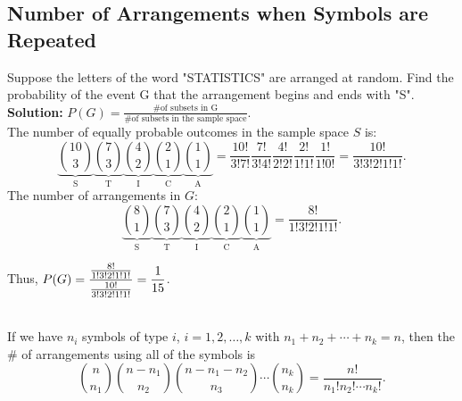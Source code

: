 \subsection{Number of Arrangements when Symbols are Repeated}

\begin{example}
    Suppose the letters of the word "STATISTICS" are arranged at random. Find the 
    probability of the event G that the arrangement begins and ends with "S". \\
    \textbf{Solution: } $P(G) = \frac{\text{\# of subsets in G}}{\text{\# of subsets in the sample space}}$. \vspace{1mm} \\
    The number of equally probable outcomes in the sample space $S$ is:
    \[
        \underbrace{\binom{10}{3}}_{\text{S}} \underbrace{\binom{7}{3}}_{\text{T}} \underbrace{\binom{4}{2}}_{\text{I}}
        \underbrace{\binom{2}{1}}_{\text{C}} \underbrace{\binom{1}{1}}_{\text{A}} =
        \frac{10!}{3!7!} \frac{7!}{3!4!} \frac{4!}{2!2!} \frac{2!}{1!1!} \frac{1!}{1!0!} = \frac{10!}{3!3!2!1!1!}.
    \]
    The number of arrangements in $G$:
    \[
        \underbrace{\binom{8}{1}}_{\text{S}} \underbrace{\binom{7}{3}}_{\text{T}} \underbrace{\binom{4}{2}}_{\text{I}}
        \underbrace{\binom{2}{1}}_{\text{C}} \underbrace{\binom{1}{1}}_{\text{A}} = \frac{8!}{1!3!2!1!1!}.
    \]

    Thus, $P(G) = \displaystyle \frac{\frac{8!}{1!3!2!1!1!}}{\frac{10!}{3!3!2!1!1!}} = \frac{1}{15}$. \\
\end{example}

\begin{remark}
    \phantom{}  \\
    If we have $n_i$ symbols of type $i$, $i = 1, 2, \ldots, k$ with $n_1 + n_2 + \cdots + n_k = n$,
    then the \# of arrangements using all of the symbols is
    \[\displaystyle \binom{n}{n_1}\binom{n - n_1}{n_2} \binom{n - n_1 - n_2}{n_3} 
    \cdots \binom{n_k}{n_k} = \frac{n!}{n_1! n_2! \cdots n_k!}.
    \] \\
\end{remark}

